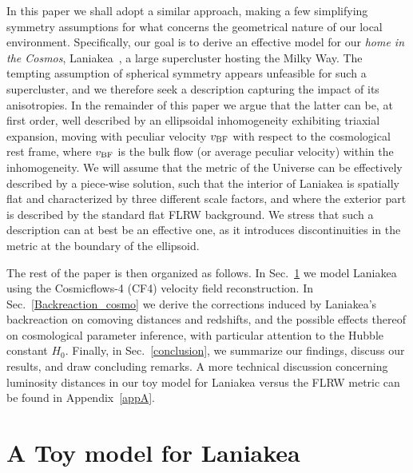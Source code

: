 \documentclass[notitlepage,nofootinbib]{revtex4-1}
\begin{document}
In this paper we shall adopt a similar approach, making a few simplifying symmetry assumptions for what concerns the geometrical nature of our local environment. Specifically, our goal is to derive an effective model for our \textit{home in the Cosmos}, Laniakea~\cite{Tully:2014gfa,Dupuy:2023ffz}, a large supercluster hosting the Milky Way. The tempting assumption of spherical symmetry appears unfeasible for such a supercluster, and we therefore seek a description capturing the impact of its anisotropies. In the remainder of this paper we argue that the latter can be, at first order, well described by an ellipsoidal inhomogeneity exhibiting triaxial expansion, moving with peculiar velocity $v_{\rm BF}$ with respect to the cosmological rest frame, where $v_{\rm BF}$ is the bulk flow (or average peculiar velocity) within the inhomogeneity.  We will assume that the metric of the Universe can be effectively described by a piece-wise solution, such that the interior of Laniakea is spatially flat and characterized by three different scale factors, and where the exterior part is described by the standard flat FLRW background. We stress that such a description can at best be an effective one, as it introduces discontinuities in the metric at the boundary of the ellipsoid.

The rest of the paper is then organized as follows. In Sec.~\ref{Laniakea} we model Laniakea using the Cosmicflows-4 (CF4) velocity field reconstruction. In Sec.~\ref{Backreaction_cosmo} we derive the corrections induced by Laniakea's backreaction on comoving distances and redshifts, and the possible effects thereof on cosmological parameter inference, with particular attention to the Hubble constant $H_0$. Finally, in Sec.~\ref{conclusion}, we summarize our findings, discuss our results, and draw concluding remarks. A more technical discussion concerning luminosity distances in our toy model for Laniakea versus the FLRW metric can be found in Appendix~\ref{appA}.

\section{A Toy model for Laniakea}

\label{Laniakea}
\end{document}
